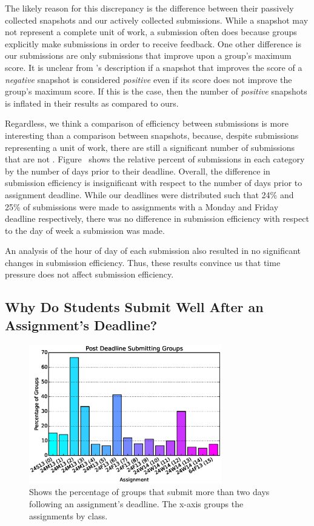 The likely reason for this discrepancy is the difference between their
passively collected snapshots and our actively collected submissions. While a
snapshot may not represent a complete unit of work, a submission often does
because groups explicitly make submissions in order to receive feedback. One
other difference is our \imp{} submissions are only submissions that improve
upon a group's maximum score. It is unclear from \spacco{}'s description if a
snapshot that improves the score of a \emph{negative} snapshot is considered
\emph{positive} even if its score does not improve the group's maximum
score. If this is the case, then the number of \emph{positive} snapshots is
inflated in their results as compared to ours.

Regardless, we think a comparison of efficiency between submissions is more
interesting than a comparison between snapshots, because, despite submissions
representing a unit of work, there are still a significant number of
submissions that are not \imp{}. Figure~ shows
the relative percent of submissions in each category by the number of days
prior to their deadline. Overall, the difference in submission efficiency is
insignificant with respect to the number of days prior to assignment
deadline. While our deadlines were distributed such that 24\% and 25\% of
submissions were made to assignments with a Monday and Friday deadline
respectively, there was no difference in submission efficiency with respect to
the day of week a submission was made.

An analysis of the hour of day of each submission also resulted in no
significant changes in submission efficiency. Thus, these results convince us
that time pressure does not affect submission efficiency.

\subsection{Why Do Students Submit Well After an Assignment's Deadline?}

\begin{figure}[!t]
\centering
\includegraphics[width=3.3in]{graphs/Post_Deadline_Submitting_Groups.eps}
\caption{Shows the percentage of groups that submit more than two days
  following an assignment's deadline. The x-axis groups the assignments by
  class.}
\end{figure}

